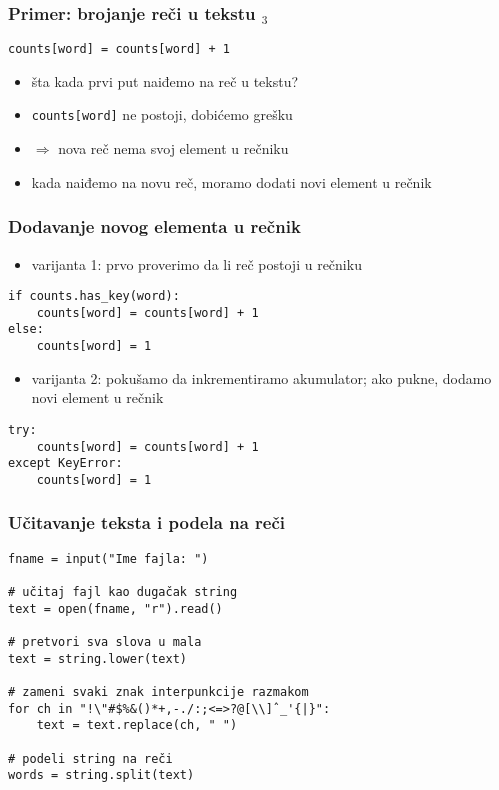 \documentclass[utf8,compress]{beamer}
\begin{document}
\begin{frame}[fragile]
  \frametitle{Primer: brojanje reči u tekstu $_3$}
\begin{verbatim}
counts[word] = counts[word] + 1
\end{verbatim}
  \begin{itemize}
    \item šta kada prvi put naiđemo na reč u tekstu?
    \item \texttt{counts[word]} ne postoji, dobićemo grešku
    \item $\Rightarrow$ nova reč nema svoj element u rečniku
    \item kada naiđemo na novu reč, moramo dodati novi element u rečnik
  \end{itemize}
\end{frame}

\begin{frame}[fragile]
  \frametitle{Dodavanje novog elementa u rečnik}
  \begin{itemize}
    \item varijanta 1: prvo proverimo da li reč postoji u rečniku
  \end{itemize}
\begin{verbatim}
if counts.has_key(word):
    counts[word] = counts[word] + 1
else:
    counts[word] = 1
\end{verbatim}
  \begin{itemize}
    \item varijanta 2: pokušamo da inkrementiramo akumulator;
    ako pukne, dodamo novi element u rečnik
  \end{itemize}
\begin{verbatim}
try:
    counts[word] = counts[word] + 1
except KeyError:
    counts[word] = 1
\end{verbatim}
\end{frame}

\begin{frame}[fragile]
  \frametitle{Učitavanje teksta i podela na reči}
\begin{verbatim}
fname = input("Ime fajla: ")

# učitaj fajl kao dugačak string
text = open(fname, "r").read()

# pretvori sva slova u mala
text = string.lower(text)

# zameni svaki znak interpunkcije razmakom
for ch in "!\"#$%&()*+,-./:;<=>?@[\\]ˆ_'{|}":
    text = text.replace(ch, " ")

# podeli string na reči
words = string.split(text)
\end{verbatim}
\end{frame}
\end{document}
